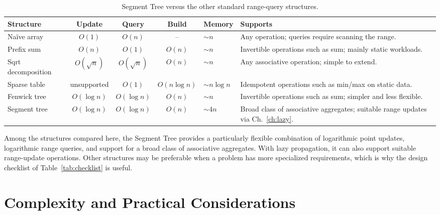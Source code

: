 \documentclass[
  11pt,
  a4paper,
  twoside=false,
  numbers=noenddot,
  headings=big,
  parskip=half,
  toc=bibliography,
  toc=listof,
  bibliography=totoc
]{scrreprt}
\newcommand{\Oh}[1]{O\!\left(#1\right)}
\newcommand{\tblhead}[1]{\textbf{\sffamily #1}}
\begin{document}
\begin{table}[H]
\centering
\caption{Segment Tree versus the other standard range-query structures.}
\label{tab:comparison-full}
\begin{tabularx}{\textwidth}{@{}>{\raggedright\arraybackslash}p{2.5cm}cccp{1.6cm}Y@{}}
\toprule
\tblhead{Structure} & \tblhead{Update} & \tblhead{Query} & \tblhead{Build} & \tblhead{Memory} & \tblhead{Supports} \\
\midrule
Na\"ive array        & $\Oh{1}$        & $\Oh{n}$        & --             & $\sim n$ & Any operation; queries require scanning the range. \\
Prefix sum           & $\Oh{n}$        & $\Oh{1}$        & $\Oh{n}$       & $\sim n$ & Invertible operations such as sum; mainly static workloads. \\
Sqrt decomposition   & $\Oh{\sqrt n}$  & $\Oh{\sqrt n}$  & $\Oh{n}$       & $\sim n$ & Any associative operation; simple to extend. \\
Sparse table         & unsupported     & $\Oh{1}$        & $\Oh{n\log n}$ & $\sim n\log n$ & Idempotent operations such as min/max on static data. \\
Fenwick tree         & $\Oh{\log n}$   & $\Oh{\log n}$   & $\Oh{n}$       & $\sim n$ & Invertible operations such as sum; simpler and less flexible. \\
Segment tree         & $\Oh{\log n}$   & $\Oh{\log n}$   & $\Oh{n}$       & $\sim 4n$ & Broad class of associative aggregates; suitable range updates via Ch.~\ref{ch:lazy}. \\
\bottomrule
\end{tabularx}
\end{table}

\begin{remark}
Among the structures compared here, the Segment Tree provides a particularly flexible combination of logarithmic point updates, logarithmic range queries, and support for a broad class of associative aggregates. With lazy propagation, it can also support suitable range-update operations. Other structures may be preferable when a problem has more specialized requirements, which is why the design checklist of Table~\ref{tab:checklist} is useful.
\end{remark}

\chapter{Complexity and Practical Considerations}
\label{ch:practical}
\end{document}
